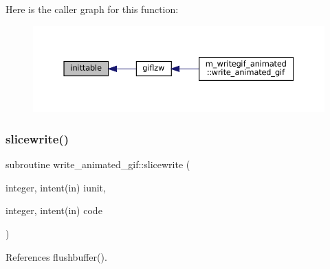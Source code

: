 Here is the caller graph for this function\+:\nopagebreak
\begin{figure}[H]
\begin{center}
\leavevmode
\includegraphics[width=350pt]{M__writegif__animated_8f90_acd7274fbac8690a12be91b542378a4eb_icgraph}
\end{center}
\end{figure}
\mbox{\label{M__writegif__animated_8f90_ac5c0245eea61f109cbf3ce5bbf38981b}} 
\subsubsection{\texorpdfstring{slicewrite()}{slicewrite()}}
{\footnotesize\ttfamily subroutine write\+\_\+animated\+\_\+gif\+::slicewrite (\begin{DoxyParamCaption}\item[{integer, intent(in)}]{iunit,  }\item[{integer, intent(in)}]{code }\end{DoxyParamCaption})\hspace{0.3cm}{\ttfamily [private]}}



References flushbuffer().

